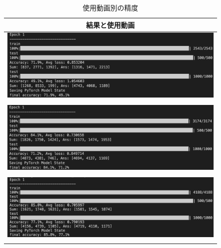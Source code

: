 \begin{table}[b]
  \begin{center}
    \begin{tabular}{|c|} \hline
      結果と使用動画 \\ \hline
        \includegraphics[width=110mm]{images/net_result/result10.png}
      \\
        \cite{ballet}\cite{thai}\cite{jpn2}
        \cite{kadokawa}\cite{bts}\cite{manolo}
        \cite{posing}\cite{boxing}\cite{shinkokyu}\cite{leaves}
      \\ \hline
        \includegraphics[width=110mm]{images/net_result/result13.png}
      \\
        \cite{jpn}\cite{ballet}\cite{thai}\cite{jpn2}
        \cite{ariana}\cite{kadokawa}\cite{bts}\cite{manolo}
        \cite{posing}\cite{boxing}\cite{running}\cite{shinkokyu}\cite{leaves}
      \\ \hline
        \includegraphics[width=110mm]{images/net_result/result16.png}
      \\
        \cite{jpn}\cite{china}\cite{ballet}\cite{thai}\cite{jpn2}
        \cite{ariana}\cite{kadokawa}\cite{bts}\cite{manolo}\cite{aito}
        \cite{radio}\cite{posing}\cite{boxing}\cite{running}\cite{shinkokyu}\cite{leaves}
      \\ \hline
    \end{tabular}
  \end{center}
  \caption{使用動画別の精度}
  \label{result}
\end{table}
\clearpage

